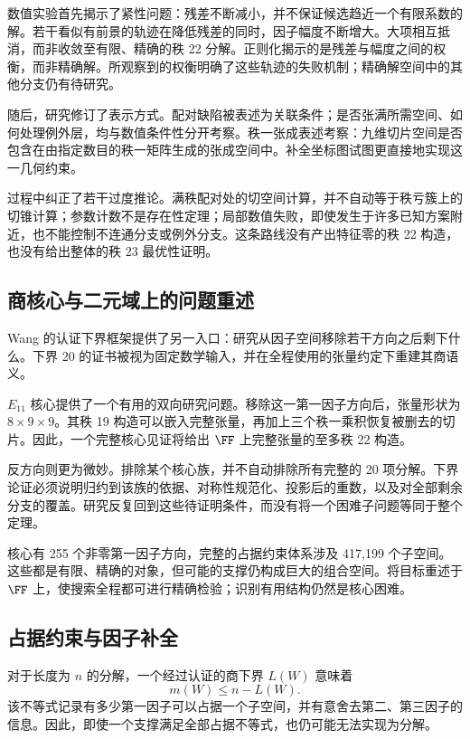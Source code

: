 数值实验首先揭示了紧性问题：残差不断减小，并不保证候选趋近一个有限系数的解。若干看似有前景的轨迹在降低残差的同时，因子幅度不断增大。大项相互抵消，而非收敛至有限、精确的秩 22 分解。正则化揭示的是残差与幅度之间的权衡，而非精确解。所观察到的权衡明确了这些轨迹的失败机制；精确解空间中的其他分支仍有待研究。

随后，研究修订了表示方式。配对缺陷被表述为关联条件；是否张满所需空间、如何处理例外层，均与数值条件性分开考察。秩一张成表述考察：九维切片空间是否包含在由指定数目的秩一矩阵生成的张成空间中。补全坐标图试图更直接地实现这一几何约束。

过程中纠正了若干过度推论。满秩配对处的切空间计算，并不自动等于秩亏簇上的切锥计算；参数计数不是存在性定理；局部数值失败，即使发生于许多已知方案附近，也不能控制不连通分支或例外分支。这条路线没有产出特征零的秩 22 构造，也没有给出整体的秩 23 最优性证明。

\subsection{商核心与二元域上的问题重述}\label{route:cores}

Wang 的认证下界框架提供了另一入口：研究从因子空间移除若干方向之后剩下什么\cite{wangautomated}。下界 20 的证书被视为固定数学输入，并在全程使用的张量约定下重建其商语义。

$E_{11}$ 核心提供了一个有用的双向研究问题。移除这一第一因子方向后，张量形状为 $8\times9\times9$。其秩 19 构造可以嵌入完整张量，再加上三个秩一乘积恢复被删去的切片。因此，一个完整核心见证将给出 $\FF$ 上完整张量的至多秩 22 构造。

反方向则更为微妙。排除某个核心族，并不自动排除所有完整的 20 项分解。下界论证必须说明归约到该族的依据、对称性规范化、投影后的重数，以及对全部剩余分支的覆盖。研究反复回到这些待证明条件，而没有将一个困难子问题等同于整个定理。

核心有 255 个非零第一因子方向，完整的占据约束体系涉及 417,199 个子空间。这些都是有限、精确的对象，但可能的支撑仍构成巨大的组合空间。将目标重述于 $\FF$ 上，使搜索全程都可进行精确检验；识别有用结构仍然是核心困难。

\subsection{占据约束与因子补全}\label{route:completion}

对于长度为 $n$ 的分解，一个经过认证的商下界 $L(W)$ 意味着
\[
 m(W)\le n-L(W).
\]
该不等式记录有多少第一因子可以占据一个子空间，并有意舍去第二、第三因子的信息。因此，即使一个支撑满足全部占据不等式，也仍可能无法实现为分解。

